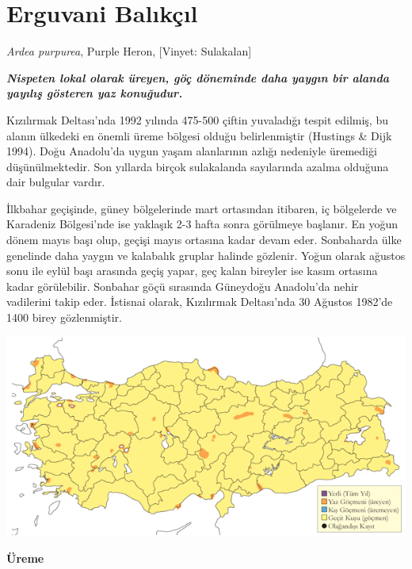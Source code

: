 \documentclass[
  letterpaper,
  DIV=11,
  numbers=noendperiod]{scrreprt}
\begin{document}
\section{Erguvani Balıkçıl}\label{erguvani-balux131kuxe7ux131l}

\emph{Ardea purpurea}, Purple Heron, {[}Vinyet: Sulakalan{]}

\textbf{\emph{Nispeten lokal olarak üreyen, göç döneminde daha yaygın
bir alanda yayılış gösteren yaz konuğudur.}}

Kızılırmak Deltası'nda 1992 yılında 475-500 çiftin yuvaladığı tespit
edilmiş, bu alanın ülkedeki en önemli üreme bölgesi olduğu
belirlenmiştir (Hustings \& Dijk 1994). Doğu Anadolu'da uygun yaşam
alanlarının azlığı nedeniyle üremediği düşünülmektedir. Son yıllarda
birçok sulakalanda sayılarında azalma olduğuna dair bulgular vardır.

İlkbahar geçişinde, güney bölgelerinde mart ortasından itibaren, iç
bölgelerde ve Karadeniz Bölgesi'nde ise yaklaşık 2-3 hafta sonra
görülmeye başlanır. En yoğun dönem mayıs başı olup, geçişi mayıs
ortasına kadar devam eder. Sonbaharda ülke genelinde daha yaygın ve
kalabalık gruplar halinde gözlenir. Yoğun olarak ağustos sonu ile eylül
başı arasında geçiş yapar, geç kalan bireyler ise kasım ortasına kadar
görülebilir. Sonbahar göçü sırasında Güneydoğu Anadolu'da nehir
vadilerini takip eder. İstisnai olarak, Kızılırmak Deltası'nda 30
Ağustos 1982'de 1400 birey gözlenmiştir.

\includegraphics{images/harita_Page_070.png}

\textbf{Üreme}
\end{document}
